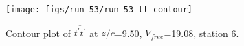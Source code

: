 \begin{figure}[H]
\centering
\texttt{[image: figs/run\_53/run\_53\_tt\_contour]}
\caption{Contour plot of $\overline{t^\prime t^\prime}$ at $z/c$=9.50, $V_{free}$=19.08, station 6.}
\label{fig:run_53_tt_contour}
\end{figure}


